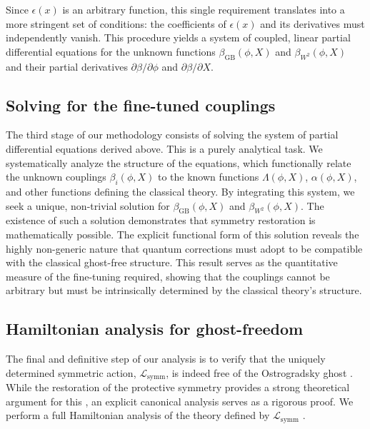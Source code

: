 \documentclass[twocolumn]{aastex631}
\begin{document}
Since $\epsilon(x)$ is an arbitrary function, this single requirement translates into a more stringent set of conditions: the coefficients of $\epsilon(x)$ and its derivatives must independently vanish. This procedure yields a system of coupled, linear partial differential equations for the unknown functions $\beta_{\text{GB}}(\phi, X)$ and $\beta_{W^2}(\phi, X)$ and their partial derivatives $\partial\beta/\partial\phi$ and $\partial\beta/\partial X$.

\subsection{Solving for the fine-tuned couplings}
The third stage of our methodology consists of solving the system of partial differential equations derived above. This is a purely analytical task. We systematically analyze the structure of the equations, which functionally relate the unknown couplings $\beta_i(\phi,X)$ to the known functions $\Lambda(\phi,X)$, $\alpha(\phi,X)$, and other functions defining the classical theory. By integrating this system, we seek a unique, non-trivial solution for $\beta_{\text{GB}}(\phi, X)$ and $\beta_{W^2}(\phi, X)$. The existence of such a solution demonstrates that symmetry restoration is mathematically possible. The explicit functional form of this solution reveals the highly non-generic nature that quantum corrections must adopt to be compatible with the classical ghost-free structure. This result serves as the quantitative measure of the fine-tuning required, showing that the couplings cannot be arbitrary but must be intrinsically determined by the classical theory's structure.

\subsection{Hamiltonian analysis for ghost-freedom}
The final and definitive step of our analysis is to verify that the uniquely determined symmetric action, $\mathcal{L}_{\text{symm}}$, is indeed free of the Ostrogradsky ghost \citep{derham2014couplingsmattermassivebigravity,kimura2016nonlocaln1supersymmetry,marzo2024mageftradiativestability,heisenberg2026asymptoticsafetygeneralizedproca}. While the restoration of the protective symmetry provides a strong theoretical argument for this \citep{milani2025nonsingularbouncingcosmologyfrgtquintom,heisenberg2026nonrenormalizationtheoremlocalfunctionals}, an explicit canonical analysis serves as a rigorous proof. We perform a full Hamiltonian analysis of the theory defined by $\mathcal{L}_{\text{symm}}$ \citep{milani2025nonsingularbouncingcosmologyfrgtquintom}.
\end{document}
